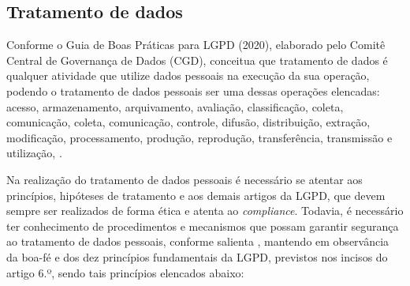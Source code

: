 \documentclass[
	12pt,				%
	openright,			%
	oneside,			%
	a4paper,			%
	english,			%
	french,				%
	spanish,			%
	brazil,				%
	]{abntex2}
\begin{document}
\subsection{Tratamento de dados}

Conforme o Guia de Boas Práticas para LGPD (2020), elaborado pelo Comitê Central de Governança de Dados (CGD), conceitua que tratamento de dados é qualquer atividade que utilize dados pessoais na execução da sua operação, podendo o tratamento de dados pessoais ser uma dessas operações elencadas: acesso, armazenamento, arquivamento, avaliação, classificação, coleta, comunicação, coleta, comunicação, controle, difusão, distribuição, extração, modificação, processamento, produção, reprodução, transferência, transmissão e utilização, \cite{01-01-LeiGeral}.

Na realização do tratamento de dados pessoais é necessário se atentar aos princípios, hipóteses de tratamento e aos demais artigos da LGPD, que devem sempre ser realizados de forma ética e atenta ao \textit{compliance}. Todavia, é necessário ter conhecimento de procedimentos e mecanismos que possam garantir segurança ao tratamento de dados pessoais, conforme salienta , mantendo em observância da boa-fé e dos dez princípios fundamentais da LGPD, previstos nos incisos do artigo 6.º, \cite{01-01-LeiGeral} sendo tais princípios elencados abaixo:
\end{document}
